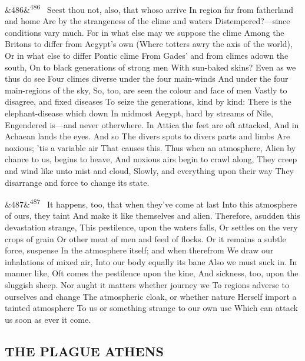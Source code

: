 \documentclass[12pt]{article}
\newcommand{\para}[1][]{\par\noindent\ifx&#1&\else\textsuperscript{\footnotesize #1}~\fi}
\begin{document}
\para[486] Seest thou not, also, that whoso arrive In region far from fatherland and home Are by the strangeness of the clime and waters Distempered?---since conditions vary much. For in what else may we suppose the clime Among the Britons to differ from Aegypt's own (Where totters awry the axis of the world), Or in what else to differ Pontic clime From Gades' and from climes adown the south, On to black generations of strong men With sun-baked skins? Even as we thus do see Four climes diverse under the four main-winds And under the four main-regions of the sky, So, too, are seen the colour and face of men Vastly to disagree, and fixed diseases To seize the generations, kind by kind: There is the elephant-disease which down In midmost Aegypt, hard by streams of Nile, Engendered is---and never otherwhere. In Attica the feet are oft attacked, And in Achaean lands the eyes. And so The divers spots to divers parts and limbs Are noxious; 'tis a variable air That causes this. Thus when an atmosphere, Alien by chance to us, begins to heave, And noxious airs begin to crawl along, They creep and wind like unto mist and cloud, Slowly, and everything upon their way They disarrange and force to change its state.

\para[487] It happens, too, that when they've come at last Into this atmosphere of ours, they taint And make it like themselves and alien. Therefore, asudden this devastation strange, This pestilence, upon the waters falls, Or settles on the very crops of grain Or other meat of men and feed of flocks. Or it remains a subtle force, suspense In the atmosphere itself; and when therefrom We draw our inhalations of mixed air, Into our body equally its bane Also we must suck in. In manner like, Oft comes the pestilence upon the kine, And sickness, too, upon the sluggish sheep. Nor aught it matters whether journey we To regions adverse to ourselves and change The atmospheric cloak, or whether nature Herself import a tainted atmosphere To us or something strange to our own use Which can attack us soon as ever it come.

\subsection*{THE PLAGUE ATHENS}
\end{document}
